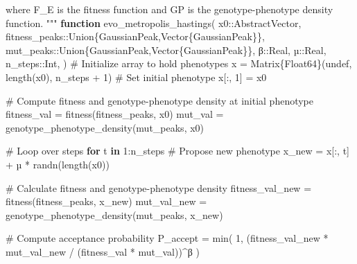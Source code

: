 \documentclass[
]{scrartcl}
\newenvironment{Shaded}{\begin{snugshade}}{\end{snugshade}}
\newcommand{\CommentTok}[1]{\textcolor[rgb]{0.37,0.37,0.37}{#1}}
\newcommand{\ConstantTok}[1]{\textcolor[rgb]{0.56,0.35,0.01}{#1}}
\newcommand{\ControlFlowTok}[1]{\textcolor[rgb]{0.00,0.23,0.31}{\textbf{#1}}}
\newcommand{\DataTypeTok}[1]{\textcolor[rgb]{0.68,0.00,0.00}{#1}}
\newcommand{\FloatTok}[1]{\textcolor[rgb]{0.68,0.00,0.00}{#1}}
\newcommand{\FunctionTok}[1]{\textcolor[rgb]{0.28,0.35,0.67}{#1}}
\newcommand{\KeywordTok}[1]{\textcolor[rgb]{0.00,0.23,0.31}{\textbf{#1}}}
\newcommand{\NormalTok}[1]{\textcolor[rgb]{0.00,0.23,0.31}{#1}}
\newcommand{\OperatorTok}[1]{\textcolor[rgb]{0.37,0.37,0.37}{#1}}
\newcommand{\StringTok}[1]{\textcolor[rgb]{0.13,0.47,0.30}{#1}}
\begin{document}
\begin{Shaded}
\begin{Highlighting}[]
\StringTok{where F\_E is the fitness function and GP is the genotype{-}phenotype density}
\StringTok{function.}
\StringTok{"""}
\KeywordTok{function} \FunctionTok{evo\_metropolis\_hastings}\NormalTok{(}
\NormalTok{    x0}\OperatorTok{::}\DataTypeTok{AbstractVector}\NormalTok{,}
\NormalTok{    fitness\_peaks}\OperatorTok{::}\DataTypeTok{Union\{GaussianPeak,Vector\{GaussianPeak\}\}}\NormalTok{,}
\NormalTok{    mut\_peaks}\OperatorTok{::}\DataTypeTok{Union\{GaussianPeak,Vector\{GaussianPeak\}\}}\NormalTok{,}
\NormalTok{    β}\OperatorTok{::}\DataTypeTok{Real}\NormalTok{,}
\NormalTok{    µ}\OperatorTok{::}\DataTypeTok{Real}\NormalTok{,}
\NormalTok{    n\_steps}\OperatorTok{::}\DataTypeTok{Int}\NormalTok{,}
\NormalTok{)}
    \CommentTok{\# Initialize array to hold phenotypes}
\NormalTok{    x }\OperatorTok{=} \FunctionTok{Matrix}\DataTypeTok{\{Float64\}}\NormalTok{(}\ConstantTok{undef}\NormalTok{, }\FunctionTok{length}\NormalTok{(x0), n\_steps }\OperatorTok{+} \FloatTok{1}\NormalTok{)}
    \CommentTok{\# Set initial phenotype}
\NormalTok{    x[}\OperatorTok{:}\NormalTok{, }\FloatTok{1}\NormalTok{] }\OperatorTok{=}\NormalTok{ x0}

    \CommentTok{\# Compute fitness and genotype{-}phenotype density at initial phenotype}
\NormalTok{    fitness\_val }\OperatorTok{=} \FunctionTok{fitness}\NormalTok{(fitness\_peaks, x0)}
\NormalTok{    mut\_val }\OperatorTok{=} \FunctionTok{genotype\_phenotype\_density}\NormalTok{(mut\_peaks, x0)}

    \CommentTok{\# Loop over steps}
    \ControlFlowTok{for}\NormalTok{ t }\KeywordTok{in} \FloatTok{1}\OperatorTok{:}\NormalTok{n\_steps}
        \CommentTok{\# Propose new phenotype}
\NormalTok{        x\_new }\OperatorTok{=}\NormalTok{ x[}\OperatorTok{:}\NormalTok{, t] }\OperatorTok{+}\NormalTok{ µ }\OperatorTok{*} \FunctionTok{randn}\NormalTok{(}\FunctionTok{length}\NormalTok{(x0))}

        \CommentTok{\# Calculate fitness and genotype{-}phenotype density}
\NormalTok{        fitness\_val\_new }\OperatorTok{=} \FunctionTok{fitness}\NormalTok{(fitness\_peaks, x\_new)}
\NormalTok{        mut\_val\_new }\OperatorTok{=} \FunctionTok{genotype\_phenotype\_density}\NormalTok{(mut\_peaks, x\_new)}

        \CommentTok{\# Compute acceptance probability}
\NormalTok{        P\_accept }\OperatorTok{=} \FunctionTok{min}\NormalTok{(}
            \FloatTok{1}\NormalTok{, (fitness\_val\_new }\OperatorTok{*}\NormalTok{ mut\_val\_new }\OperatorTok{/}\NormalTok{ (fitness\_val }\OperatorTok{*}\NormalTok{ mut\_val))}\OperatorTok{\^{}}\NormalTok{β}
\NormalTok{        )}


\end{Highlighting}
\end{Shaded}
\end{document}
